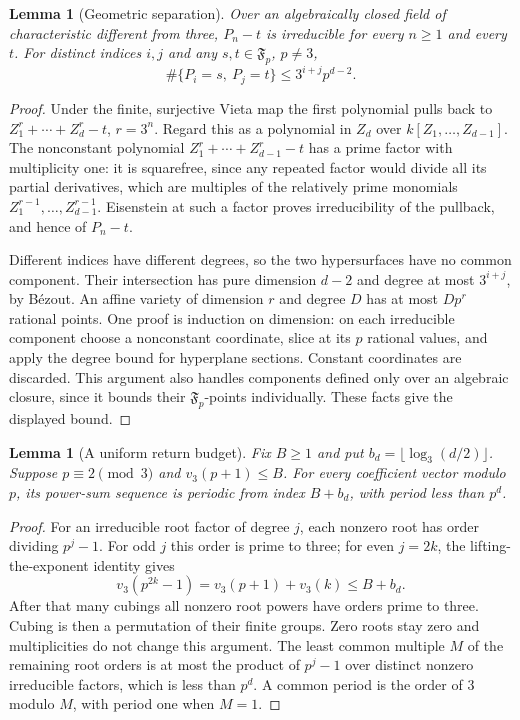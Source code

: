 \documentclass[11pt,a4paper]{article}
\newtheorem{lemma}[theorem]{Lemma}
\theoremstyle{definition}\newtheorem{definition}[theorem]{Definition}
\theoremstyle{remark}\newtheorem{remark}[theorem]{Remark}
\newcommand{\F}{\mathfrak F}\newcommand{\FF}{\mathbb F}
\begin{document}
\begin{lemma}[Geometric separation]\label{pis:lem:shiftedgeometry}
Over an algebraically closed field of characteristic different from
three, $P_n-t$ is irreducible for every $n\ge1$ and every $t$.
For distinct indices $i,j$ and any $s,t\in\F_p$, $p\ne3$,
\[
 \#\{P_i=s,\ P_j=t\}\le 3^{i+j}p^{d-2}.
\]
\end{lemma}
\begin{proof}
Under the finite, surjective Vieta map the first polynomial pulls
back to $Z_1^r+\cdots+Z_d^r-t$, $r=3^n$. Regard this as a polynomial
in $Z_d$ over $k[Z_1,\ldots,Z_{d-1}]$. The nonconstant polynomial
$Z_1^r+\cdots+Z_{d-1}^r-t$ has a prime factor with multiplicity one:
it is squarefree, since any repeated factor would divide all its
partial derivatives, which are multiples of the relatively prime
monomials $Z_1^{r-1},\ldots,Z_{d-1}^{r-1}$. Eisenstein at such a
factor proves irreducibility of the pullback, and hence of $P_n-t$.

Different indices have different degrees, so the two hypersurfaces
have no common component. Their intersection has pure dimension
$d-2$ and degree at most $3^{i+j}$, by B\'ezout. An affine variety of
dimension $r$ and degree $D$ has at most $Dp^r$ rational points.
One proof is induction on dimension: on each irreducible component
choose a nonconstant coordinate, slice at its $p$ rational values,
and apply the degree bound for hyperplane sections. Constant
coordinates are discarded. This argument also handles components
defined only over an algebraic closure, since it bounds their
$\F_p$-points individually. These facts give the displayed bound.
\end{proof}

\begin{lemma}[A uniform return budget]\label{pis:lem:returnbudget}
Fix $B\ge1$ and put $b_d=\lfloor\log_3(d/2)\rfloor$.
Suppose $p\equiv2\pmod3$ and $v_3(p+1)\le B$. For every coefficient
vector modulo $p$, its power-sum sequence is periodic from index
$B+b_d$, with period less than $p^d$.
\end{lemma}
\begin{proof}
For an irreducible root factor of degree $j$, each nonzero root has
order dividing $p^j-1$. For odd $j$ this order is prime to three;
for even $j=2k$, the lifting-the-exponent identity gives
\[
 v_3(p^{2k}-1)=v_3(p+1)+v_3(k)\le B+b_d.
\]
After that many cubings all nonzero root powers have orders prime
to three. Cubing is then a permutation of their finite groups.
Zero roots stay zero and multiplicities do not change this argument.
The least common multiple $M$ of the remaining root orders is at
most the product of $p^j-1$ over distinct nonzero irreducible factors,
which is less than $p^d$. A common period is the order of $3$ modulo
$M$, with period one when $M=1$.
\end{proof}
\end{document}
